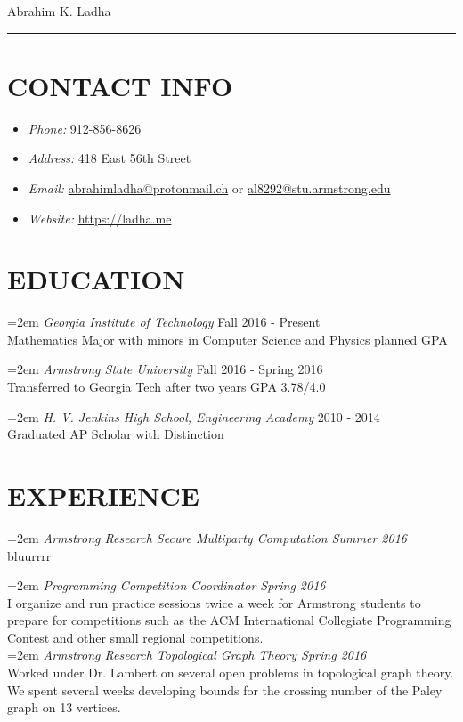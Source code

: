 \documentclass[11pt]{article} %
\begin{document}
{\huge Abrahim K. Ladha}\\
\hrule
\section*{CONTACT INFO}
\begin{itemize}
  \setlength{\itemsep}{1pt}
  \setlength{\parskip}{0pt}
  \setlength{\parsep}{0pt}
\item \emph{Phone:} 912-856-8626
\item \emph{Address:} 418 East 56th Street
\item \emph{Email:}  \href{mailto:abrahimladha@protonmail.ch}{abrahimladha@protonmail.ch} or \href{mailto:al8292@stu.armstrong.edu}{al8292@stu.armstrong.edu}%
\item \emph{Website:}  \url{https://ladha.me} %
\end{itemize}
\section*{EDUCATION}
\hangindent=2em
\emph{Georgia Institute of Technology} Fall 2016 - Present\\
Mathematics Major with minors in Computer Science and Physics planned GPA 

\hangindent=2em
\emph{Armstrong State University} Fall 2016 - Spring 2016\\
Transferred to Georgia Tech after two years GPA 3.78/4.0

\hangindent=2em
\emph{H. V. Jenkins High School, Engineering Academy} 2010 - 2014\\
Graduated AP Scholar with Distinction
\section*{EXPERIENCE}
\hangindent=2em
\emph{Armstrong Research Secure Multiparty Computation Summer 2016}\\
bluurrrr\

\hangindent=2em
\emph{Programming Competition Coordinator Spring 2016}\\
I organize and run practice sessions twice a week for Armstrong students to prepare for competitions such as the ACM International Collegiate Programming Contest and other small regional competitions.\\

\hangindent=2em
\emph{Armstrong Research Topological Graph Theory Spring 2016}\\
Worked under Dr. Lambert on several open problems in topological graph theory. We spent several weeks developing bounds for the crossing number of the Paley graph on 13 vertices. \\
\end{document}
